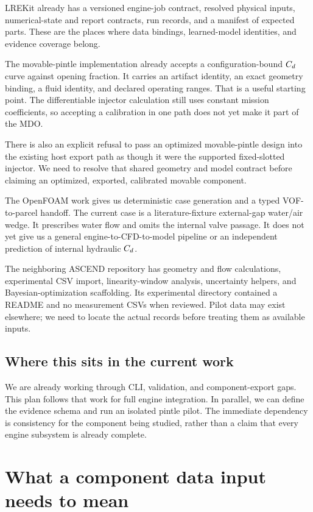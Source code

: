 LREKit already has a versioned engine-job contract, resolved physical inputs, numerical-state and report contracts, run records, and a manifest of expected parts. These are the places where data bindings, learned-model identities, and evidence coverage belong.

The movable-pintle implementation already accepts a configuration-bound $C_d$ curve against opening fraction. It carries an artifact identity, an exact geometry binding, a fluid identity, and declared operating ranges. That is a useful starting point. The differentiable injector calculation still uses constant mission coefficients, so accepting a calibration in one path does not yet make it part of the MDO.

There is also an explicit refusal to pass an optimized movable-pintle design into the existing host export path as though it were the supported fixed-slotted injector. We need to resolve that shared geometry and model contract before claiming an optimized, exported, calibrated movable component.

The OpenFOAM work gives us deterministic case generation and a typed VOF-to-parcel handoff. The current case is a literature-fixture external-gap water/air wedge. It prescribes water flow and omits the internal valve passage. It does not yet give us a general engine-to-CFD-to-model pipeline or an independent prediction of internal hydraulic $C_d$.

The neighboring ASCEND repository has geometry and flow calculations, experimental CSV import, linearity-window analysis, uncertainty helpers, and Bayesian-optimization scaffolding. Its experimental directory contained a README and no measurement CSVs when reviewed. Pilot data may exist elsewhere; we need to locate the actual records before treating them as available inputs.

\subsection{Where this sits in the current work}

We are already working through CLI, validation, and component-export gaps. This plan follows that work for full engine integration. In parallel, we can define the evidence schema and run an isolated pintle pilot. The immediate dependency is consistency for the component being studied, rather than a claim that every engine subsystem is already complete.

\section{What a component data input needs to mean}

